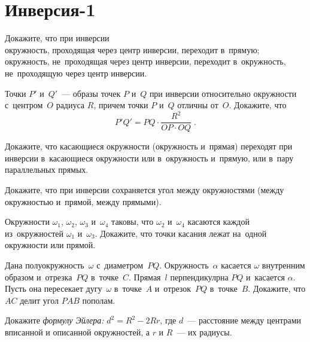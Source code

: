 
\section*{Инверсия-1}


\begin{problems}

\item
Докажите, что при инверсии
\\
\subproblem
окружность, проходящая через центр инверсии, переходит в~прямую;
\\
\subproblem
окружность, не~проходящая через центр инверсии, переходит в~окружность,
не~проходящую через центр инверсии.

\item
Точки $P'$ и~$Q'$~--- образы точек $P$ и~$Q$ при инверсии относительно
окружности с~центром~$O$ радиуса $R$, причем точки $P$ и~$Q$ отличны от~$O$.
Докажите, что
\[
    P'Q' = PQ \cdot \frac{R^2}{OP \cdot OQ}
\; . \]

\item
Докажите, что касающиеся окружности (окружность и~прямая) переходят при
инверсии в~касающиеся окружности или в~окружность и~прямую, или в~пару
параллельных прямых.

\item
Докажите, что при инверсии сохраняется угол между окружностями (между
окружностью и~прямой, между прямыми).

\item
Окружности $\omega_1$, $\omega_2$, $\omega_3$ и~$\omega_4$ таковы, что
$\omega_2$ и~$\omega_4$ касаются каждой из~окружностей $\omega_1$ и~$\omega_3$.
Докажите, что точки касания лежат на~одной окружности или прямой.

\item
Дана полуокружность~$\omega$ с~диаметром~$PQ$.
Окружность~$\alpha$ касается $\omega$ внутренним образом и~отрезка~$PQ$
в~точке~$C$.
Прямая~$l$ перпендикулрна $PQ$ и~касается $\alpha$.
Пусть она пересекает дугу~$\omega$ в~точке~$A$ и~отрезок~$PQ$ в~точке~$B$.
Докажите, что $AC$ делит угол $PAB$ пополам.

\item
Докажите \emph{формулу Эйлера:} $d^2 = R^2 - 2 R r$, где $d$~--- расстояние
между центрами вписанной и описанной окружностей, а $r$ и $R$~--- их радиусы.


\end{problems}
